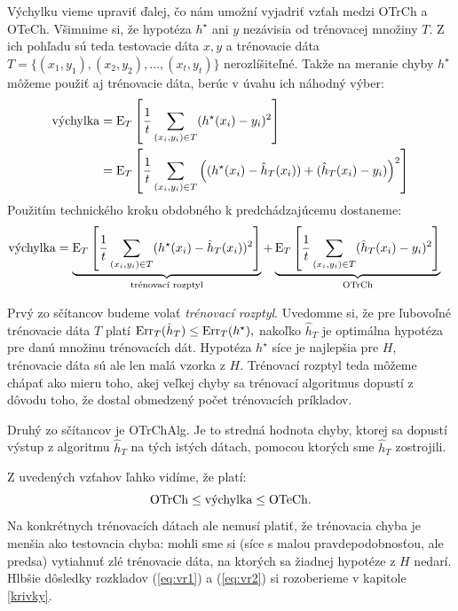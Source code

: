 Výchylku vieme upraviť ďalej, čo nám umožní vyjadriť vzťah medzi
OTrCh a OTeCh. Všimnime si, že hypotéza $h^\star$ ani $y$ nezávisia
od trénovacej množiny $T$. Z ich pohľadu sú teda testovacie dáta $x, y$
a trénovacie dáta $T=\{(x_1,y_1),(x_2,y_2),\dots,(x_t,y_t)\}$ nerozlíšiteľné.
Takže na meranie chyby
$h^\star$ môžeme použiť aj trénovacie dáta, berúc v úvahu ich náhodný
výber:
\begin{align}
  \vVychylka
    &= \E_T \left[ \frac{1}{t}\sum_{(x_i,y_i)\in T}  (h^\star(x_i) - y_i)^2  \right] \\
    &= \E_T \left[ \frac{1}{t}\sum_{(x_i,y_i)\in T}  \left( (h^\star(x_i) - \hat{h}_T(x_i)) + (\hat{h}_T(x_i) - y_i) \right)^2  \right]
\end{align}
Použitím technického kroku obdobného k predchádzajúcemu dostaneme:
\begin{align}
  \vVychylka &= \underbrace{\E_T \left[ \frac{1}{t} \sum_{(x_i,y_i)\in T} (h^\star(x_i) - \hat{h}_T(x_i))^2 \right]}_\vRozptylT
    + \underbrace{\E_T \left[ \frac{1}{t} \sum_{(x_i,y_i)\in T}  (\hat{h}_T(x_i) - y_i)^2 \right]}_{\text{OTrCh}}
 \label{eq:vr2}
\end{align}

Prvý zo sčítancov budeme volať \emph{trénovací rozptyl}.
Uvedomme si, že pre ľubovoľné trénovacie dáta $T$ platí
$\Err_T(\hat{h}_T) \leq \Err_T(h^\star),$
nakoľko $\hat{h}_T$ je optimálna hypotéza pre danú množinu trénovacích
dát. Hypotéza $h^\star$ síce je najlepšia pre $H$, trénovacie dáta sú ale len
malá vzorka z $H$.
Trénovací rozptyl teda môžeme chápať ako mieru toho, akej veľkej
chyby sa trénovací algoritmus dopustí z dôvodu toho, že dostal obmedzený
počet trénovacích príkladov.
\medskip

Druhý zo sčítancov je OTrChAlg. Je to stredná hodnota
chyby, ktorej sa dopustí výstup z algoritmu $\hat{h}_T$ na tých istých
dátach, pomocou ktorých sme $\hat{h}_T$ zostrojili.

\medskip

Z uvedených vzťahov ľahko vidíme, že platí:
$$ \text{OTrCh} \leq \vVychylka \leq \text{OTeCh}. $$
Na konkrétnych trénovacích dátach ale nemusí platiť, že trénovacia
chyba je menšia ako testovacia chyba: mohli sme si (síce s malou
pravdepodobnosťou, ale predsa) vytiahnuť zlé trénovacie dáta, na
ktorých sa žiadnej hypotéze z $H$ nedarí. Hlbšie dôsledky rozkladov
(\ref{eq:vr1}) a (\ref{eq:vr2}) si rozoberieme v kapitole \ref{krivky}.

